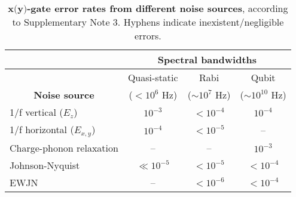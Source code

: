 \documentclass[aps,prb,superscriptaddress,nobibnotes,preprint]{revtex4-1}%
\begin{document}
\begin{table}[h]
	\begin{tabular}{p{1.35in}b{.7in}b{.65in}b{.7in}} %
		\arrayrulecolor{white}
		{} & \multicolumn{3}{c}{\cellcolor[rgb]{.17,.54,.57}\textbf{\color{white}Spectral bandwidths}} \\ \hline 
		{\cellcolor[rgb]{.13,.43,.64}} & \multicolumn{1}{c}{\cellcolor[rgb]{.36,.77,.8}Quasi-static} &\multicolumn{1}{c}{\cellcolor[rgb]{.36,.77,.8}Rabi} & \multicolumn{1}{c}{\cellcolor[rgb]{.36,.77,.8}Qubit} \\
		\multicolumn{1}{c}{\cellcolor[rgb]{.13,.43,.64}\textbf{\color{white}Noise source}} & \multicolumn{1}{c}{\cellcolor[rgb]{.36,.77,.8}($<10^{6}$ Hz)} & \multicolumn{1}{c}{\cellcolor[rgb]{.36,.77,.8}($\sim10^{7}$ Hz)} & \multicolumn{1}{c}{\cellcolor[rgb]{.36,.77,.8}($\sim10^{10}$ Hz)} \\ \hline\hline
		\cellcolor[rgb]{.4,.68,.87} 1/f vertical ($E_z$) & \multicolumn{1}{c}{\cellcolor[rgb]{.93,.85,.63}$10^{-3}$} & \multicolumn{1}{c}{\cellcolor[rgb]{.93,.85,.63}$<10^{-4}$} & \multicolumn{1}{c}{\cellcolor[rgb]{.93,.85,.63}$10^{-4}$} \\ \hline 
		\cellcolor[rgb]{.4,.68,.87} 1/f horizontal ($E_{x,y}$) & \multicolumn{1}{c}{\cellcolor[rgb]{.93,.85,.63}$10^{-4}$} & \multicolumn{1}{c}{\cellcolor[rgb]{.93,.85,.63}$<10^{-5}$} & \multicolumn{1}{c}{\cellcolor[rgb]{.93,.85,.63}--} \\ \hline 
		\cellcolor[rgb]{.4,.68,.87} Charge-phonon relaxation & \multicolumn{1}{c}{\cellcolor[rgb]{.93,.85,.63}--} & \multicolumn{1}{c}{\cellcolor[rgb]{.93,.85,.63}--} & \multicolumn{1}{c}{\cellcolor[rgb]{.93,.85,.63}$10^{-3}$} \\ \hline 
		\cellcolor[rgb]{.4,.68,.87} Johnson-Nyquist & \multicolumn{1}{c}{\cellcolor[rgb]{.93,.85,.63}$\ll10^{-5}$} & \multicolumn{1}{c}{\cellcolor[rgb]{.93,.85,.63}$<10^{-5}$} & \multicolumn{1}{c}{\cellcolor[rgb]{.93,.85,.63}$<10^{-4}$} \\ \hline 
		\cellcolor[rgb]{.4,.68,.87} EWJN & \multicolumn{1}{c}{\cellcolor[rgb]{.93,.85,.63}--} & \multicolumn{1}{c}{\cellcolor[rgb]{.93,.85,.63}$<10^{-6}$} & \multicolumn{1}{c}{\cellcolor[rgb]{.93,.85,.63}$<10^{-4}$} \\ \hline 
	\end{tabular}
	\caption{\textbf{$\textbf{x(y)}$-gate error rates from different noise sources}, according to Supplementary Note 3. Hyphens indicate inexistent/negligible errors.}
	\label{table:xy-gate-errors}
\end{table}
\end{document}
